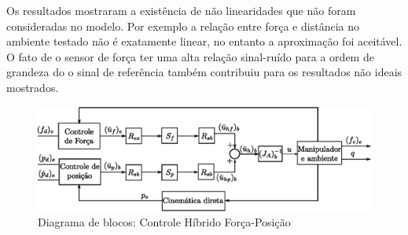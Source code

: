 Os resultados mostraram a existência de não linearidades que não foram consideradas no modelo. Por exemplo a relação entre força e distância no ambiente testado não é exatamente linear, no entanto a aproximação foi aceitável. O fato de o sensor de força ter uma alta relação sinal-ruído para a ordem de grandeza do o sinal de referência também contribuiu para os resultados não ideais mostrados. 
 \begin{figure}[H]
  \centering
  \includegraphics[width=0.5\linewidth]{./img/hybrid.eps}
  \caption{Diagrama de blocos: Controle Híbrido Força-Posição}
  \label{fig:sub2}
\end{figure}